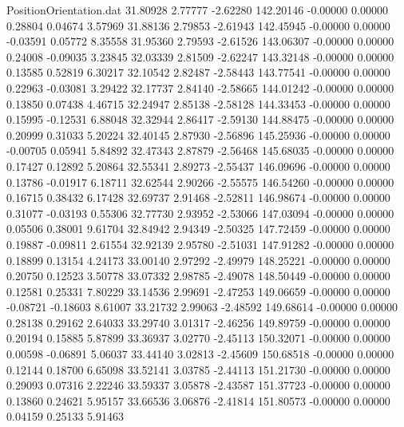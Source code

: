 \begin{filecontents}{PositionOrientation.dat}
  31.80928    2.77777   -2.62280   142.20146   -0.00000    0.00000    0.28804    0.04674    3.57969
  31.88136    2.79853   -2.61943   142.45945   -0.00000    0.00000   -0.03591    0.05772    8.35558
  31.95360    2.79593   -2.61526   143.06307   -0.00000    0.00000    0.24008   -0.09035    3.23845
  32.03339    2.81509   -2.62247   143.32148   -0.00000    0.00000    0.13585    0.52819    6.30217
  32.10542    2.82487   -2.58443   143.77541   -0.00000    0.00000    0.22963   -0.03081    3.29422
  32.17737    2.84140   -2.58665   144.01242   -0.00000    0.00000    0.13850    0.07438    4.46715
  32.24947    2.85138   -2.58128   144.33453   -0.00000    0.00000    0.15995   -0.12531    6.88048
  32.32944    2.86417   -2.59130   144.88475   -0.00000    0.00000    0.20999    0.31033    5.20224
  32.40145    2.87930   -2.56896   145.25936   -0.00000    0.00000   -0.00705    0.05941    5.84892
  32.47343    2.87879   -2.56468   145.68035   -0.00000    0.00000    0.17427    0.12892    5.20864
  32.55341    2.89273   -2.55437   146.09696   -0.00000    0.00000    0.13786   -0.01917    6.18711
  32.62544    2.90266   -2.55575   146.54260   -0.00000    0.00000    0.16715    0.38432    6.17428
  32.69737    2.91468   -2.52811   146.98674   -0.00000    0.00000    0.31077   -0.03193    0.55306
  32.77730    2.93952   -2.53066   147.03094   -0.00000    0.00000    0.05506    0.38001    9.61704
  32.84942    2.94349   -2.50325   147.72459   -0.00000    0.00000    0.19887   -0.09811    2.61554
  32.92139    2.95780   -2.51031   147.91282   -0.00000    0.00000    0.18899    0.13154    4.24173
  33.00140    2.97292   -2.49979   148.25221   -0.00000    0.00000    0.20750    0.12523    3.50778
  33.07332    2.98785   -2.49078   148.50449   -0.00000    0.00000    0.12581    0.25331    7.80229
  33.14536    2.99691   -2.47253   149.06659   -0.00000    0.00000   -0.08721   -0.18603    8.61007
  33.21732    2.99063   -2.48592   149.68614   -0.00000    0.00000    0.28138    0.29162    2.64033
  33.29740    3.01317   -2.46256   149.89759   -0.00000    0.00000    0.20194    0.15885    5.87899
  33.36937    3.02770   -2.45113   150.32071   -0.00000    0.00000    0.00598   -0.06891    5.06037
  33.44140    3.02813   -2.45609   150.68518   -0.00000    0.00000    0.12144    0.18700    6.65098
  33.52141    3.03785   -2.44113   151.21730   -0.00000    0.00000    0.29093    0.07316    2.22246
  33.59337    3.05878   -2.43587   151.37723   -0.00000    0.00000    0.13860    0.24621    5.95157
  33.66536    3.06876   -2.41814   151.80573   -0.00000    0.00000    0.04159    0.25133    5.91463

\end{filecontents}
